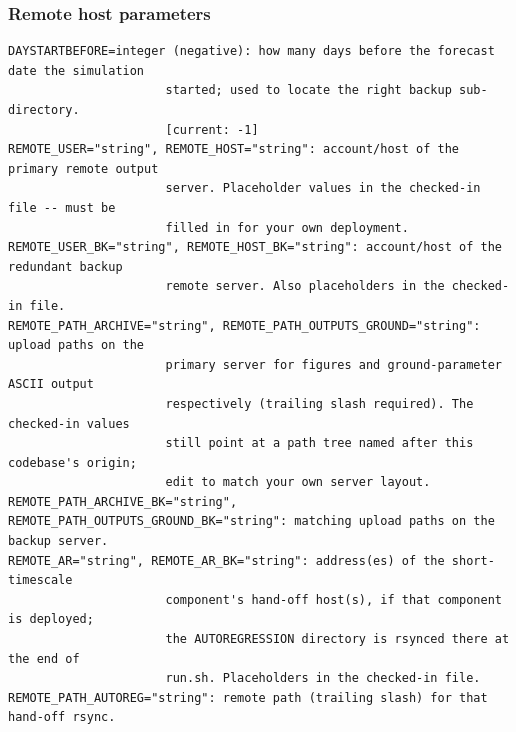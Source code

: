 \subsubsection{Remote host parameters}
\begin{lstlisting}
DAYSTARTBEFORE=integer (negative): how many days before the forecast date the simulation
                      started; used to locate the right backup sub-directory.
                      [current: -1]
REMOTE_USER="string", REMOTE_HOST="string": account/host of the primary remote output
                      server. Placeholder values in the checked-in file -- must be
                      filled in for your own deployment.
REMOTE_USER_BK="string", REMOTE_HOST_BK="string": account/host of the redundant backup
                      remote server. Also placeholders in the checked-in file.
REMOTE_PATH_ARCHIVE="string", REMOTE_PATH_OUTPUTS_GROUND="string": upload paths on the
                      primary server for figures and ground-parameter ASCII output
                      respectively (trailing slash required). The checked-in values
                      still point at a path tree named after this codebase's origin;
                      edit to match your own server layout.
REMOTE_PATH_ARCHIVE_BK="string",
REMOTE_PATH_OUTPUTS_GROUND_BK="string": matching upload paths on the backup server.
REMOTE_AR="string", REMOTE_AR_BK="string": address(es) of the short-timescale
                      component's hand-off host(s), if that component is deployed;
                      the AUTOREGRESSION directory is rsynced there at the end of
                      run.sh. Placeholders in the checked-in file.
REMOTE_PATH_AUTOREG="string": remote path (trailing slash) for that hand-off rsync.
\end{lstlisting}
